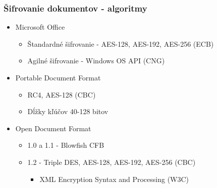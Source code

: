 \documentclass[xcolor=dvipsnames]{beamer}
\begin{document}

\begin{frame}
\frametitle{Šifrovanie dokumentov - algoritmy}
	\begin{itemize}
	\item Microsoft Office
	\begin{itemize}
		\item  Štandardné šifrovanie - AES-128, AES-192, AES-256 (ECB)
		\item Agilné šifrovanie - Windows OS API (CNG)
	\end{itemize}
	\item Portable Document Format
	\begin{itemize}
		\item RC4, AES-128 (CBC)
		\item Dĺžky kľúčov 40-128 bitov
	\end{itemize}
	\item Open Document Format
	\begin{itemize}
		\item  1.0 a 1.1 - Blowfish CFB
		\item 1.2 - Triple DES, AES-128, AES-192, AES-256 (CBC)
		\begin{itemize}
			\item XML Encryption Syntax and Processing (W3C)
		\end{itemize}
	\end{itemize}
	\end{itemize}
\end{frame}
\end{document}
